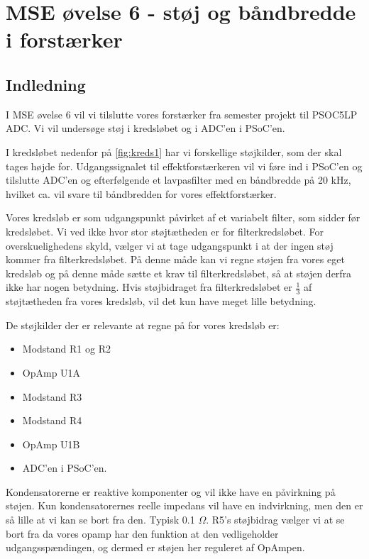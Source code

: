 \documentclass[a4paper, 11pt, article,oneside,openany]{memoir} %
\begin{document}
	
\chapter{MSE øvelse 6 - støj og båndbredde i forstærker}

\section{Indledning}
I MSE øvelse 6 vil vi tilslutte vores forstærker fra semester projekt til PSOC5LP ADC. Vi vil undersøge støj i kredsløbet og i ADC'en i PSoC'en.

I kredsløbet nedenfor på \cref{fig:kreds1} har vi forskellige støjkilder, som der skal tages højde for. Udgangssignalet til effektforstærkeren vil vi føre ind i PSoC'en og tilslutte ADC'en og efterfølgende et lavpasfilter med en båndbredde på 20 kHz, hvilket ca. vil svare til båndbredden for vores effektforstærker.

Vores kredsløb er som udgangspunkt påvirket af et variabelt filter, som sidder før kredsløbet. Vi ved ikke hvor stor støjtætheden er for filterkredsløbet. For overskuelighedens skyld, vælger vi at tage udgangspunkt i at der ingen støj kommer fra filterkredsløbet. På denne måde kan vi regne støjen fra vores eget kredsløb og på denne måde sætte et krav til filterkredsløbet, så at støjen derfra ikke har nogen betydning. Hvis støjbidraget fra filterkredsløbet er $\frac{1}{3}$ af støjtætheden fra vores kredsløb, vil det kun have meget lille betydning.

De støjkilder der er relevante at regne på for vores kredsløb er:

\begin{itemize}
	\item Modstand R1 og R2
	\item OpAmp U1A
	\item Modstand R3
	\item Modstand R4
	\item OpAmp U1B
	\item ADC'en i PSoC'en.	
\end{itemize}

Kondensatorerne er reaktive komponenter og vil ikke have en påvirkning på støjen. Kun kondensatorernes reelle impedans vil have en indvirkning, men den er så lille at vi kan se bort fra den. Typisk 0.1 $\Omega$.
R5's støjbidrag vælger vi at se bort fra da vores opamp har den funktion at den vedligeholder udgangsspændingen, og dermed er støjen her reguleret af OpAmpen.
\end{document}
